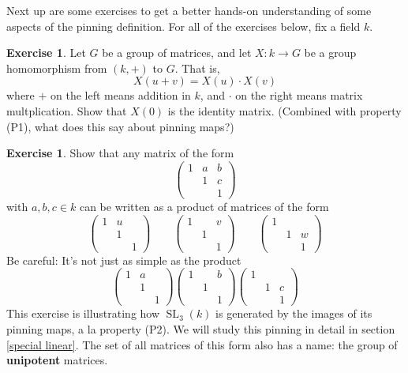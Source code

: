 \documentclass[12pt]{article}
\theoremstyle{definition}
\newtheorem{exercise}[theorem]{Exercise}
\newcommand{\tbf}{\textbf}
\newcommand{\noi}{\noindent}
\DeclareMathOperator{\SL}{SL}
\begin{document}
\noi Next up are some exercises to get a better hands-on understanding of some aspects of the pinning definition. For all of the exercises below, fix a field $k$.

\begin{exercise}
Let $G$ be a group of matrices, and let $X:k \to G$ be a group homomorphism from $(k, +)$ to $G$. That is,
\[
	X(u + v) = X(u) \cdot X(v)
\]
where $+$ on the left means addition in $k$, and $\cdot$ on the right means matrix multplication. Show that $X(0)$ is the identity matrix. (Combined with property (P1), what does this say about pinning maps?)
\end{exercise}

\begin{exercise}
Show that any matrix of the form
\[
	\begin{pmatrix}
		1 & a & b \\
		& 1 & c\\
		&& 1
	\end{pmatrix}
\]
with $a,b,c \in k$ can be written as a product of matrices of the form
\[
	\begin{pmatrix}
		1 & u &  \\
		& 1 & \\
		&& 1
	\end{pmatrix}
	\qquad
	\begin{pmatrix}
		1 & & v  \\
		& 1 & \\
		&& 1
	\end{pmatrix}
	\qquad
	\begin{pmatrix}
		1 & &  \\
		& 1 & w \\
		&& 1
	\end{pmatrix}
\]
Be careful: It's not just as simple as the product
\[
	\begin{pmatrix}
		1 & a &  \\
		& 1 & \\
		&& 1
	\end{pmatrix}
	\begin{pmatrix}
		1 & & b  \\
		& 1 & \\
		&& 1
	\end{pmatrix}
	\begin{pmatrix}
		1 & &  \\
		& 1 & c \\
		&& 1
	\end{pmatrix}
\]
This exercise is illustrating how $\SL_3(k)$ is generated by the images of its pinning maps, a la property (P2). We will study this pinning in detail in section \ref{special linear}. The set of all matrices of this form also has a name: the group of \tbf{unipotent} matrices.
\end{exercise}
\end{document}
